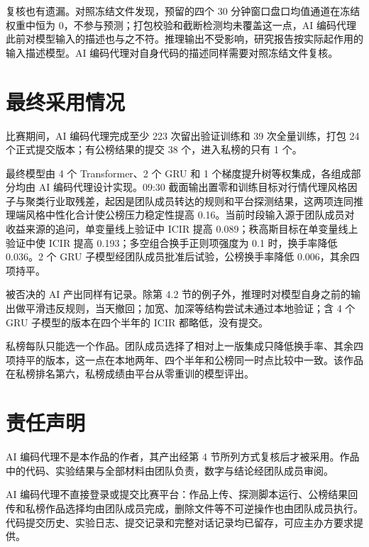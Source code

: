 \documentclass[UTF8,a4paper,zihao=-4,fontset=none]{ctexart}
\begin{document}
复核也有遗漏。对照冻结文件发现，预留的四个 30 分钟窗口盘口均值通道在冻结权重中恒为 0，不参与预测；打包校验和截断检测均未覆盖这一点，AI 编码代理此前对模型输入的描述也与之不符。推理输出不受影响，研究报告按实际起作用的输入描述模型。AI 编码代理对自身代码的描述同样需要对照冻结文件复核。

\section{最终采用情况}

比赛期间，AI 编码代理完成至少 223 次留出验证训练和 39 次全量训练，打包 24 个正式提交版本；有公榜结果的提交 38 个，进入私榜的只有 1 个。

最终模型由 4 个 Transformer、2 个 GRU 和 1 个梯度提升树等权集成，各组成部分均由 AI 编码代理设计实现。09:30 截面输出置零和训练目标对行情代理风格因子与聚类行业取残差，起因是团队成员转达的规则和平台探测结果，这两项连同推理端风格中性化合计使公榜压力稳定性提高 0.16。当前时段输入源于团队成员对收益来源的追问，单变量线上验证中 ICIR 提高 0.089；秩高斯目标在单变量线上验证中使 ICIR 提高 0.193；多空组合换手正则项强度为 0.1 时，换手率降低 0.036。2 个 GRU 子模型经团队成员批准后试验，公榜换手率降低 0.006，其余四项持平。

被否决的 AI 产出同样有记录。除第 4.2 节的例子外，推理时对模型自身之前的输出做平滑违反规则，当天撤回；加宽、加深等结构尝试未通过本地验证；含 4 个 GRU 子模型的版本在四个半年的 ICIR 都略低，没有提交。

私榜每队只能选一个作品。团队成员选择了相对上一版集成只降低换手率、其余四项持平的版本，这一点在本地两年、四个半年和公榜同一时点比较中一致。该作品在私榜排名第六，私榜成绩由平台从零重训的模型评出。

\section{责任声明}

AI 编码代理不是本作品的作者，其产出经第 4 节所列方式复核后才被采用。作品中的代码、实验结果与全部材料由团队负责，数字与结论经团队成员审阅。

AI 编码代理不直接登录或提交比赛平台：作品上传、探测脚本运行、公榜结果回传和私榜作品选择均由团队成员完成，删除文件等不可逆操作也由团队成员执行。代码提交历史、实验日志、提交记录和完整对话记录均已留存，可应主办方要求提供。
\end{document}
